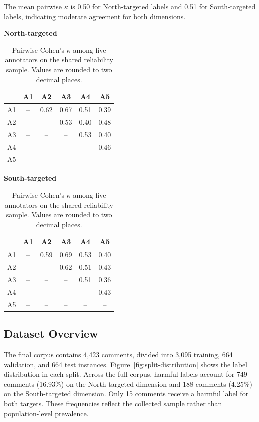 \documentclass[11pt]{article}
\begin{document}
The mean pairwise $\kappa$ is 0.50 for North-targeted labels and 0.51 for South-targeted labels, indicating moderate agreement for both dimensions.

\begin{table}[H]
\centering
\caption{Pairwise Cohen's $\kappa$ among five annotators on the shared reliability sample. Values are rounded to two decimal places.}
\label{tab:kappa}
\begin{minipage}{0.47\textwidth}
\centering
\textbf{North-targeted}\\[0.35em]
\begin{tabular}{c|ccccc}
 & A1 & A2 & A3 & A4 & A5 \\ \hline
A1 & -- & 0.62 & 0.67 & 0.51 & 0.39 \\
A2 & -- & -- & 0.53 & 0.40 & 0.48 \\
A3 & -- & -- & -- & 0.53 & 0.40 \\
A4 & -- & -- & -- & -- & 0.46 \\
A5 & -- & -- & -- & -- & -- \\
\end{tabular}
\end{minipage}
\hfill
\begin{minipage}{0.47\textwidth}
\centering
\textbf{South-targeted}\\[0.35em]
\begin{tabular}{c|ccccc}
 & A1 & A2 & A3 & A4 & A5 \\ \hline
A1 & -- & 0.59 & 0.69 & 0.53 & 0.40 \\
A2 & -- & -- & 0.62 & 0.51 & 0.43 \\
A3 & -- & -- & -- & 0.51 & 0.36 \\
A4 & -- & -- & -- & -- & 0.43 \\
A5 & -- & -- & -- & -- & -- \\
\end{tabular}
\end{minipage}
\end{table}

\subsection{Dataset Overview}

The final corpus contains 4,423 comments, divided into 3,095 training, 664 validation, and 664 test instances. Figure~\ref{fig:split-distribution} shows the label distribution in each split. Across the full corpus, harmful labels account for 749 comments (16.93\%) on the North-targeted dimension and 188 comments (4.25\%) on the South-targeted dimension. Only 15 comments receive a harmful label for both targets. These frequencies reflect the collected sample rather than population-level prevalence.
\end{document}

